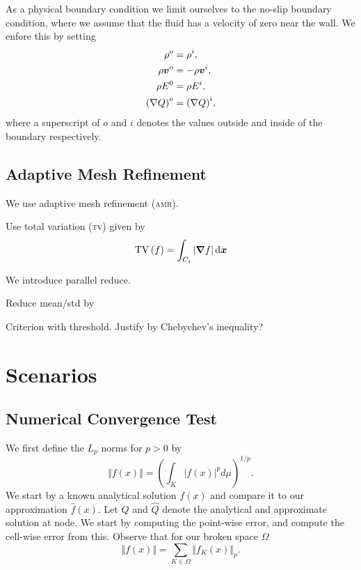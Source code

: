 As a physical boundary condition we limit ourselves to the no-slip boundary condition, where we assume that the fluid has a velocity of zero near the wall.
We enfore this by setting
\begin{align}
  \label{eq:no-slip}
  \begin{split}
  \rho^o &= \rho^i, \\
  \rho \bm{v}^o &= -\rho \bm{v}^i, \\
  \rho E^0 &= \rho E^i,\\
  {(\nabla Q)}^o &= {(\nabla Q)}^i,
  \end{split}
\end{align}
where a superscript of $o$ and $i$ denotes the values outside and inside of the boundary respectively.

\section{Adaptive Mesh Refinement}
\label{sec:amr}
We use adaptive mesh refinement (\textsc{amr}).

Use total variation (\textsc{tv}) given by
\begin{equation}
  \label{eq:tv}
  \operatorname{TV}\left( f \right) =
\intdcell{ \vert \gradient{f} \vert }
\end{equation}

We introduce parallel reduce.

Reduce mean/std by~\cite{chan1982updating}

Criterion with threshold.
Justify by Chebychev's inequality?

\chapter{Scenarios}\label{sec:scenarios}
\section{Numerical Convergence Test}
We first define the $L_p$ norms for $p > 0$ by
\begin{equation}
  \label{eq:Lp-nrom}
  \Vert f(x) \Vert = \left( \int_K \vert f(x) \vert^p d\mu  \right)^{1/p}.
\end{equation}
We start by a known analytical solution $f(x)$ and compare it to our approximation $\hat{f}(x)$.
Let $Q$ and $\hat{Q}$ denote the analytical and approximate solution at node.
We start by computing the point-wise error, and compute the cell-wise error from this.
Observe that for our broken space $\Omega$
\begin{equation}
  \label{eq:lp-norm-broken}
 \Vert f(x) \Vert = \sum_{K \in \Omega} \Vert f_K(x) \Vert_p.
\end{equation}

